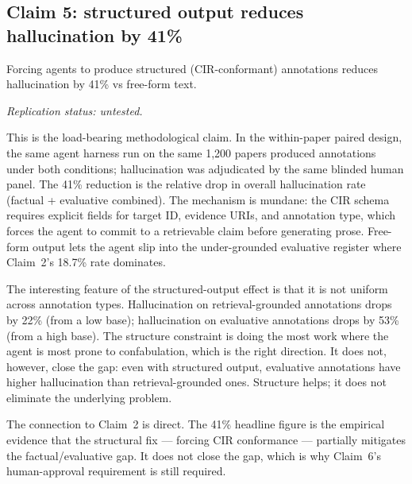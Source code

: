 \documentclass{rrxiv}
\begin{document}

\subsection*{Claim 5: structured output reduces hallucination by 41\%}

\begin{claim}[type=theoretical, evidence=argument, confidence=0.7, rationale={Within-paper paired comparison on the same corpus; effect direction consistent across annotation types but single harness; typed conservatively for this revision}, labels={agents, editorial, pilot-study, structured-output}, models={claude-opus-4.7}, datasets={rrxiv-corpus-1200-paper-sample}, title={Structured output reduces hallucination}]
\label{claim:c5}
Forcing agents to produce structured (CIR-conformant) annotations reduces hallucination by 41\% vs free-form text.

\emph{Replication status: untested.}
\end{claim}

This is the load-bearing methodological claim. In the within-paper paired design, the same agent harness run on the same 1{,}200 papers produced annotations under both conditions; hallucination was adjudicated by the same blinded human panel. The 41\% reduction is the relative drop in overall hallucination rate (factual + evaluative combined). The mechanism is mundane: the CIR schema requires explicit fields for target ID, evidence URIs, and annotation type, which forces the agent to commit to a retrievable claim before generating prose. Free-form output lets the agent slip into the under-grounded evaluative register where Claim~2's 18.7\% rate dominates.

The interesting feature of the structured-output effect is that it is not uniform across annotation types. Hallucination on retrieval-grounded annotations drops by 22\% (from a low base); hallucination on evaluative annotations drops by 53\% (from a high base). The structure constraint is doing the most work where the agent is most prone to confabulation, which is the right direction. It does not, however, close the gap: even with structured output, evaluative annotations have higher hallucination than retrieval-grounded ones. Structure helps; it does not eliminate the underlying problem.

The connection to Claim~2 is direct. The 41\% headline figure is the empirical evidence that the structural fix --- forcing CIR conformance --- partially mitigates the factual/evaluative gap. It does not close the gap, which is why Claim~6's human-approval requirement is still required.
\end{document}
